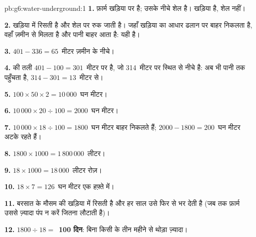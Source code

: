 \begin{solution}{pb:g6:water-underground:1}
\textbf{1.} फ़ार्म खड़िया पर है; उसके नीचे शेल है। खड़िया  है, शेल
नहीं।

\textbf{2.}  खड़िया में रिसती है और शेल पर रुक जाती है। जहाँ खड़िया का आधार
ढलान पर बाहर निकलता है, वहाँ  ज़मीन से मिलता है और पानी बाहर आता है:
यही  है।

\textbf{3.} $401 - 336 = 65$~मीटर ज़मीन के नीचे।

\textbf{4.}  की तली $401 - 100 = 301$~मीटर पर है, जो 314~मीटर पर स्थित
 से नीचे है:  अब भी पानी तक पहुँचता है, $314 - 301 =
13$~मीटर से।

\textbf{5.} $100 \times 50 \times 2 = 10\,000$~घन मीटर।

\textbf{6.} $10\,000 \times 20 \div 100 = 2000$~घन मीटर।

\textbf{7.} $10\,000 \times 18 \div 100 = 1800$~घन मीटर बाहर निकलते हैं;
$2000 - 1800 = 200$~घन मीटर अटके रहते हैं।

\textbf{8.} $1800 \times 1000 = 1\,800\,000$~लीटर।

\textbf{9.} $18 \times 1000 = 18\,000$~लीटर रोज़।

\textbf{10.} $18 \times 7 = 126$~घन मीटर एक हफ़्ते में।

\textbf{11.} बरसात के मौसम की  खड़िया में रिसती है और हर साल उसे फिर से भर
देती है (जब तक फ़ार्म उससे ज़्यादा पंप न करें जितना  लौटाती है)।

\textbf{12.} $1800 \div 18 = $~\textbf{100 दिन}: बिना किसी  के तीन
महीने से थोड़ा ज़्यादा।
\end{solution}
